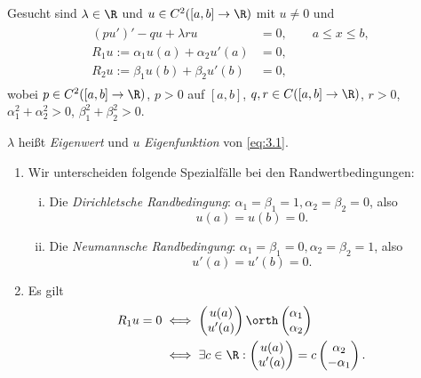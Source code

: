 \begin{df} \label{3.6}
	Gesucht sind $\lambda \in \R$ und $u \in C^2([a,b]\to \R)$ mit $u \neq 0$ und
	\begin{align} \label{eq:3.1}
		\begin{aligned}
		(pu')' - qu + \lambda ru &= 0, \qquad a\le x \le b, \\
		R_1 u := \alpha_1 u(a) + \alpha_2 u'(a) &= 0, \\
		R_2 u := \beta_1 u(b) + \beta_2 u'(b) &= 0,
		\end{aligned}
	\end{align}
	wobei $p \in C^2([a,b] \to \R)$, $p > 0$ auf $[a,b]$, $q,r \in C([a,b] \to \R)$, $r>0$, $\alpha_1^2 + \alpha_2^2 > 0$, $\beta_1^2 + \beta_2^2 > 0$.

	$\lambda$ heißt \emph{Eigenwert} und $u$ \emph{Eigenfunktion} von \eqref{eq:3.1}.
\end{df}

\begin{nt} \label{3.7}
	\begin{enumerate}[1)]
		\item
			Wir unterscheiden folgende Spezialfälle bei den Randwertbedingungen:
			\begin{enumerate}[i)]
				\item
					Die \emph{Dirichletsche Randbedingung}: $\alpha_1 = \beta_1 = 1, \alpha_2 = \beta_2 = 0$, also
					\[
						u(a) = u(b) = 0.
					\]
				\item
					Die \emph{Neumannsche Randbedingung}: $\alpha_1 = \beta_1 = 0, \alpha_2 = \beta_2 = 1$, also
					\[
						u'(a) = u'(b) = 0.
					\]
			\end{enumerate}
		\item
			Es gilt
			\begin{align*}
				R_1 u = 0
				&\iff \begin{pmatrix}
					u(a) \\ u'(a)
				\end{pmatrix} \orth \begin{pmatrix}
					\alpha_1 \\ \alpha_2
				\end{pmatrix} \\
				&\iff \exists c \in \R : \begin{pmatrix}
					u(a) \\ u'(a)
				\end{pmatrix} = c \begin{pmatrix}
					\alpha_2 \\ -\alpha_1
				\end{pmatrix}.
			\end{align*}


	\end{enumerate}
\end{nt}

